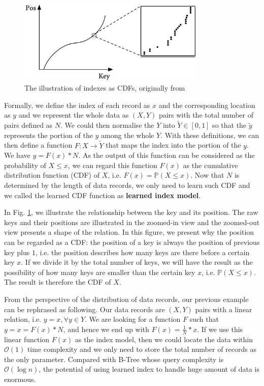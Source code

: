 \begin{figure}[!htb]
\centering
\includegraphics[width=0.8\textwidth]{graphs/introduction/cdf_assumptions}
\caption{The illustration of indexes as CDFs, originally from \cite{kraska2018case}}
\label{fig:indexes_as_cdf}
\end{figure}


Formally, we define the index of each record as $x$ and the corresponding location as $y$ and we represent the whole data as $(X, Y)$ pairs with the total number of pairs defined as $N$. We could then normalise the $Y$ into $\tilde{Y}\in[0,1]$ so that the $\tilde{y}$ represents the portion of the $y$ among the whole $Y$. With these definitions, we can then define a function $F:X\to \tilde{Y}$ that maps the index into the portion of the $y$. We have $y=F(x)* N$. As the output of this function can be considered as the probability of $X\leq x$, we can regard this function $F(x)$ as the cumulative distribution function (CDF) of $X$, i.e. $F(x)=\mathbb{P}(X\leq x)$. Now that $N$ is determined by the length of data records, we only need to learn such CDF and we called the learned CDF function as \textbf{learned index model}.

In Fig. \ref{fig:indexes_as_cdf}, we illustrate the relationship between the key and its position. The raw keys and their positions are illustrated in the zoomed-in view and the zoomed-out view presents a shape of the relation. In this figure, we present why the position can be regarded as a CDF: the position of a key is always the position of previous key plus $1$, i.e. the position describes how many keys are there before a certain key $x$. If we divide it by the total number of keys, we will have the result as the possibility of how many keys are smaller than the certain key $x$, i.e. $\mathbb{P}(X\leq x)$. The result is therefore the CDF of $X$.

\begin{mscexample}
	From the perspective of the distribution of data records, our previous example can be rephrased as following. Our data records are $(X, Y)$ pairs with a linear relation, i.e. $y=x, \forall y\in Y$. We are looking for a function $F$ such that $y=x=F(x)* N$, and hence we end up with $F(x)=\frac{1}{N}*x$. If we use this linear function $F(x)$ as the index model, then we could locate the data within $\mathcal{O}(1)$ time complexity and we only need to store the total number of records as the only parameter. Compared with B-Tree whose query complexity is $\mathcal{O}(\log n)$, the potential of using learned index to handle huge amount of data is enormous. 
\end{mscexample}

